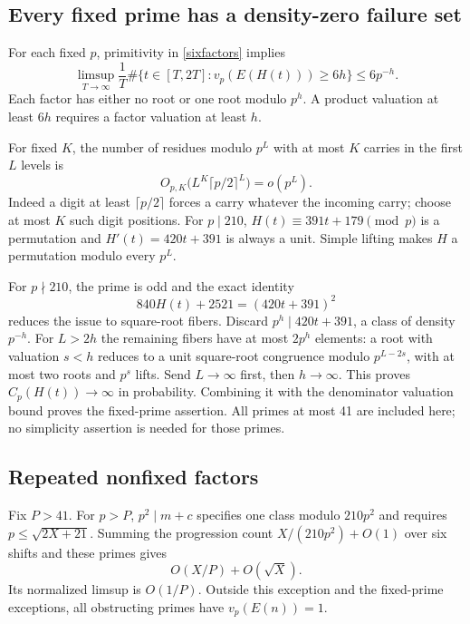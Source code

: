 \documentclass[11pt]{article}
\begin{document}
\subsection{Every fixed prime has a density-zero failure set}
For each fixed $p$, primitivity in \eqref{sixfactors} implies
\[
 \limsup_{T\to\infty}\frac1T\#\{t\in[T,2T]:v_p(E(H(t)))\ge6h\}\le6p^{-h}.
\]
Each factor has either no root or one root modulo $p^h$. A product valuation
at least $6h$ requires a factor valuation at least $h$.

For fixed $K$, the number of residues modulo $p^L$ with at most $K$ carries in
the first $L$ levels is
\[
 O_{p,K}\bigl(L^K\lceil p/2\rceil^L\bigr)=o(p^L).
\]
Indeed a digit at least $\lceil p/2\rceil$ forces a carry whatever the incoming
carry; choose at most $K$ such digit positions. For $p\mid210$,
$H(t)\equiv391t+179\pmod p$ is a permutation and
$H'(t)=420t+391$ is always a unit. Simple lifting makes $H$ a permutation
modulo every $p^L$.

For $p\nmid210$, the prime is odd and the exact identity
\begin{equation}\label{square}
 840H(t)+2521=(420t+391)^2
\end{equation}
reduces the issue to square-root fibers. Discard $p^h\mid420t+391$, a class of
density $p^{-h}$. For $L>2h$ the remaining fibers have at most $2p^h$ elements:
a root with valuation $s<h$ reduces to a unit square-root congruence modulo
$p^{L-2s}$, with at most two roots and $p^s$ lifts. Send $L\to\infty$ first,
then $h\to\infty$. This proves $C_p(H(t))\to\infty$ in probability. Combining
it with the denominator valuation bound proves the fixed-prime assertion.
All primes at most 41 are included here; no simplicity assertion is needed
for those primes.

\subsection{Repeated nonfixed factors}
Fix $P>41$. For $p>P$, $p^2\mid m+c$ specifies one class modulo $210p^2$ and
requires $p\le\sqrt{2X+21}$. Summing the progression count
$X/(210p^2)+O(1)$ over six shifts and these primes gives
\[
 O(X/P)+O(\sqrt X).
\]
Its normalized limsup is $O(1/P)$. Outside this exception and the fixed-prime
exceptions, all obstructing primes have $v_p(E(n))=1$.
\end{document}
